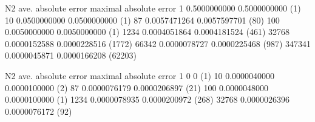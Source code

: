 \bye


N2      ave. absolute error maximal absolute error
1       0.5000000000        0.5000000000 (1)
10      0.0500000000        0.0500000000 (1)
87      0.0057471264        0.0057597701 (80)
100     0.0050000000        0.0050000000 (1)
1234    0.0004051864        0.0004181524 (461)
32768   0.0000152588        0.0000228516 (1772)
66342   0.0000078727        0.0000225468 (987)
347341  0.0000045871        0.0000166208 (62203)


N2      ave. absolute error maximal absolute error
1       0                   0            (1)
10      0.0000040000        0.0000100000 (2)
87      0.0000076179        0.0000206897 (21)
100     0.0000048000        0.0000100000 (1)
1234    0.0000078935        0.0000200972 (268)
32768   0.0000026396        0.0000076172 (92)           

